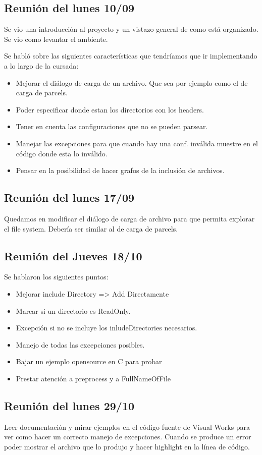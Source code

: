 \documentclass[a4paper,oneside,10pt]{article}
\begin{document}
\subsection{Reunión del lunes 10/09}
Se vio una introducción al proyecto y un vistazo general de como está organizado.
Se vio como levantar el ambiente.

Se habló sobre las siguientes características que tendríamos que ir implementando a lo largo de la cursada:
\begin{itemize}
  \item Mejorar el diálogo de carga de un archivo. Que sea por ejemplo como el de carga de parcels.
  \item Poder especificar donde estan los directorios con los headers.
  \item Tener en cuenta las configuraciones que no se pueden parsear.
  \item Manejar las excepciones para que cuando hay una conf. inválida muestre en el código donde esta lo inválido.
  \item Pensar en la posibilidad de hacer grafos de la inclusión de archivos.
\end{itemize}

\subsection{Reunión del lunes 17/09}
Quedamos en modificar el diálogo de carga de archivo para que permita explorar el file system. Debería ser similar al de carga de parcels.

\subsection{Reunión del Jueves 18/10}
Se hablaron los siguientes puntos:
\begin{itemize}
 \item Mejorar include Directory => Add Directamente
 \item Marcar si un directorio es ReadOnly.
 \item Excepción si no se incluye los inludeDirectories necesarios. 
 \item Manejo de todas las excepciones posibles.
 \item Bajar un ejemplo opensource en C para probar
 \item Prestar atención a preprocess y a FullNameOfFile
\end{itemize}

\subsection{Reunión del lunes 29/10}
Leer documentación y mirar ejemplos en el código fuente de Visual Works para ver como hacer un correcto manejo de excepciones.
Cuando se produce un error poder mostrar el archivo que lo produjo y hacer highlight en la línea de código.
\end{document}
